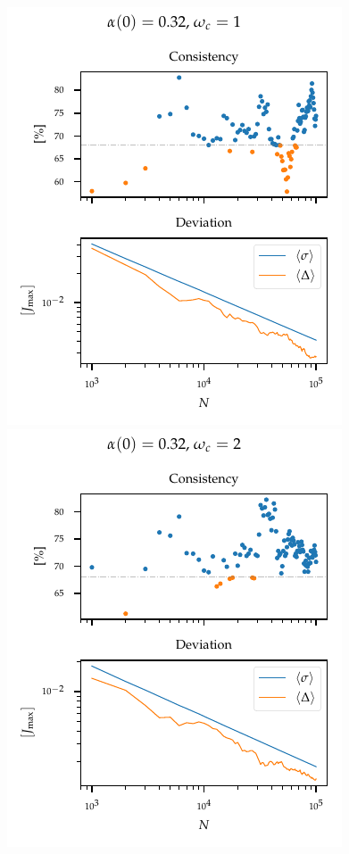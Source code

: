 \begin{figure}[p]
  \centering
  \includegraphics{figs/analytic_comp/consistency_development_0.pdf}
  \includegraphics{figs/analytic_comp/consistency_development_1.pdf}

\end{figure}

